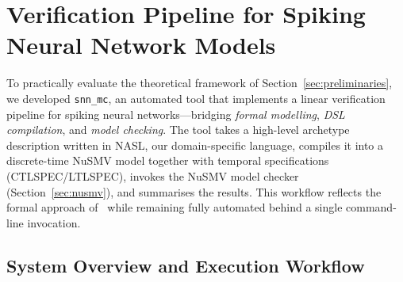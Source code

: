 \documentclass[
]{ceurart}
\begin{document}
\section{Verification Pipeline for Spiking Neural Network Models}
\label{sec:pipeline}

To practically evaluate the theoretical framework of
Section~\ref{sec:preliminaries}, we developed \texttt{snn\_mc}, an automated
tool that implements a linear verification pipeline for spiking neural
networks---bridging \emph{formal modelling}, \emph{DSL compilation}, and
\emph{model checking}. The tool takes a high-level archetype description
written in \textsc{NASL}, our domain-specific language, compiles it into a
discrete-time NuSMV model together with temporal specifications
(CTLSPEC/LTLSPEC), invokes the NuSMV model checker
(Section~\ref{sec:nusmv}), and summarises the results. This workflow reflects
the formal approach of~\cite{DeMaria2020,DeMaria2016,DeMaria2017} while
remaining fully automated behind a single command-line invocation.

\subsection{System Overview and Execution Workflow}
\label{sec:overview}
\end{document}
